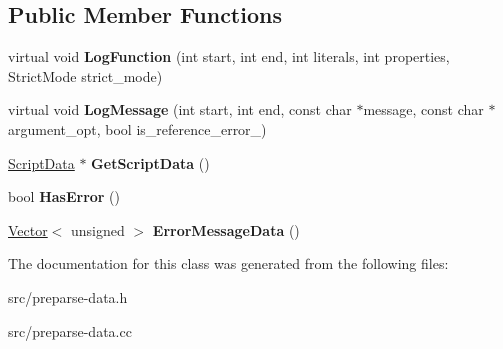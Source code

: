 \subsection*{Public Member Functions}
\begin{DoxyCompactItemize}
\item 
\hypertarget{classv8_1_1internal_1_1_complete_parser_recorder_a87d5de0471a71bb659e4e155561b6c41}{}virtual void {\bfseries Log\+Function} (int start, int end, int literals, int properties, Strict\+Mode strict\+\_\+mode)\label{classv8_1_1internal_1_1_complete_parser_recorder_a87d5de0471a71bb659e4e155561b6c41}

\item 
\hypertarget{classv8_1_1internal_1_1_complete_parser_recorder_a7b52123519268ee59302a7b34a68c6d4}{}virtual void {\bfseries Log\+Message} (int start, int end, const char $\ast$message, const char $\ast$argument\+\_\+opt, bool is\+\_\+reference\+\_\+error\+\_\+)\label{classv8_1_1internal_1_1_complete_parser_recorder_a7b52123519268ee59302a7b34a68c6d4}

\item 
\hypertarget{classv8_1_1internal_1_1_complete_parser_recorder_a250c61a627236e468121e873908b3d88}{}\hyperlink{classv8_1_1internal_1_1_script_data}{Script\+Data} $\ast$ {\bfseries Get\+Script\+Data} ()\label{classv8_1_1internal_1_1_complete_parser_recorder_a250c61a627236e468121e873908b3d88}

\item 
\hypertarget{classv8_1_1internal_1_1_complete_parser_recorder_a3c2eaa9eb33dc6709c9fad1fa5492cca}{}bool {\bfseries Has\+Error} ()\label{classv8_1_1internal_1_1_complete_parser_recorder_a3c2eaa9eb33dc6709c9fad1fa5492cca}

\item 
\hypertarget{classv8_1_1internal_1_1_complete_parser_recorder_a190d770c5a6c4e684085d8b14ff39dab}{}\hyperlink{classv8_1_1internal_1_1_vector}{Vector}$<$ unsigned $>$ {\bfseries Error\+Message\+Data} ()\label{classv8_1_1internal_1_1_complete_parser_recorder_a190d770c5a6c4e684085d8b14ff39dab}

\end{DoxyCompactItemize}


The documentation for this class was generated from the following files\+:\begin{DoxyCompactItemize}
\item 
src/preparse-\/data.\+h\item 
src/preparse-\/data.\+cc\end{DoxyCompactItemize}
